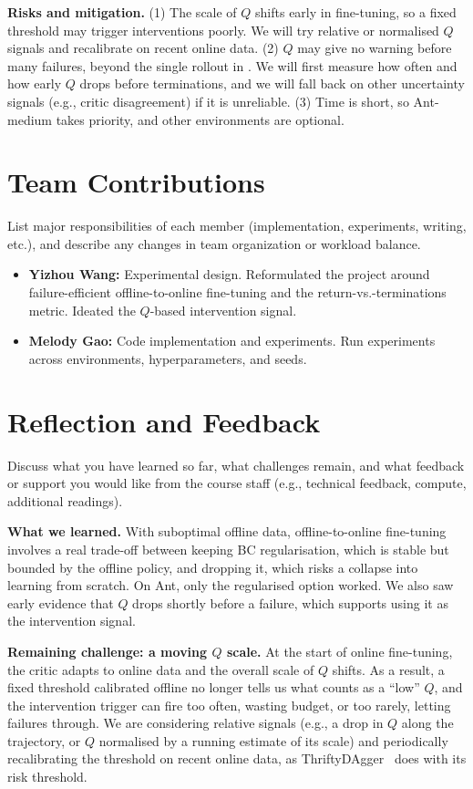 \documentclass[11pt, letterpaper]{cmu}
\let\cref\crtcref
\begin{document}
\textbf{Risks and mitigation.}
(1) The scale of $Q$ shifts early in fine-tuning, so a fixed threshold may trigger interventions poorly.
We will try relative or normalised $Q$ signals and recalibrate on recent online data.
(2) $Q$ may give no warning before many failures, beyond the single rollout in \cref{app:video}.
We will first measure how often and how early $Q$ drops before terminations, and we will fall back on
other uncertainty signals (e.g., critic disagreement) if it is unreliable. (3) Time is short, so Ant-medium takes priority, and other environments are optional.

\section{Team Contributions}
List major responsibilities of each member (implementation, experiments, writing, etc.), 
and describe any changes in team organization or workload balance.

\begin{itemize}
    \item \textbf{Yizhou Wang:} Experimental design. Reformulated the project around failure-efficient offline-to-online
    fine-tuning and the return-vs.-terminations metric.
    Ideated the $Q$-based intervention signal.
    \item \textbf{Melody Gao:} Code implementation and experiments. Run 
    experiments across environments, hyperparameters, and seeds.
\end{itemize}

\section{Reflection and Feedback}
Discuss what you have learned so far, what challenges remain, 
and what feedback or support you would like from the course staff (e.g., technical feedback, compute, additional readings).

\textbf{What we learned.}
With suboptimal offline data, offline-to-online fine-tuning involves a real trade-off between keeping BC
regularisation, which is stable but bounded by the offline policy, and dropping it, which risks a collapse
into learning from scratch. On Ant, only the regularised option worked. We also saw early evidence
that $Q$ drops shortly before a failure, which supports using it as the intervention signal.

\textbf{Remaining challenge: a moving $Q$ scale.}
At the start of online fine-tuning, the critic adapts to online data and the overall scale of
$Q$ shifts. As a result, a fixed threshold calibrated offline no longer tells us what counts as a
``low'' $Q$, and the intervention trigger can fire too often, wasting budget, or too rarely, letting
failures through. We are considering relative signals (e.g., a drop in $Q$ along the trajectory, or
$Q$ normalised by a running estimate of its scale) and periodically recalibrating the threshold on recent
online data, as ThriftyDAgger~\cite{hoque2021thriftydagger} does with its risk threshold.
\end{document}

